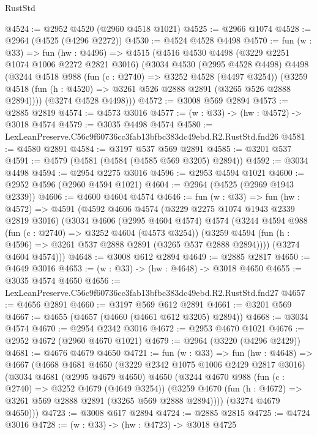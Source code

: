 \begin{lexlean}{RustStd}
\begin{coremodule}
@4524 := @2952 @4520 (@2960 @4518 @1021)
@4525 := @2966 @1074
@4528 := @2964 (@4525 (@4296 @2272))
@4530 := @4524 @4528 @4498
@4570 := fun (w : @33) =>
  fun (hw : @4496) =>
  @4515
    (@4516
      @4530
      @4498
      (@3229 @2251 @1074 @1006 @2272 @2821 @3016)
      (@3034
        @4530
        (@2995 @4528 @4498)
        @4498
        (@3244
          @4518
          @988
          (fun (c : @2740) => @3252 @4528 (@4497 @3254))
          (@3259 @4518 (fun (h : @4520) => @3261 @526 @2888 @2891 (@3265 @526 @2888 @2894))))
        (@3274 @4528 @4498)))
@4572 := @3008 @569 @2894
@4573 := @2885 @2819
@4574 := @4573 @3016
@4577 := (w : @33) -> (hw : @4572) -> @3018 @4574
@4579 := @3035 @4498 @4574
@4580 := LexLeanPreserve.C56c9f60736cc3fab13bfbc383dc49ebd.R2.RustStd.fnd26
@4581 := @4580 @2891
@4584 := @3197 @537 @569 @2891
@4585 := @3201 @537
@4591 := @4579 (@4581 (@4584 (@4585 @569 @3205) @2894))
@4592 := @3034 @4498
@4594 := @2954 @2275 @3016
@4596 := @2953 @4594 @1021
@4600 := @2952 @4596 (@2960 @4594 @1021)
@4604 := @2964 (@4525 (@2969 @1943 @2339))
@4606 := @4600 @4604 @4574
@4646 := fun (w : @33) =>
  fun (hw : @4572) =>
  @4591
    (@4592
      @4606
      @4574
      (@3229 @2275 @1074 @1943 @2339 @2819 @3016)
      (@3034
        @4606
        (@2995 @4604 @4574)
        @4574
        (@3244
          @4594
          @988
          (fun (c : @2740) => @3252 @4604 (@4573 @3254))
          (@3259 @4594 (fun (h : @4596) => @3261 @537 @2888 @2891 (@3265 @537 @2888 @2894))))
        (@3274 @4604 @4574)))
@4648 := @3008 @612 @2894
@4649 := @2885 @2817
@4650 := @4649 @3016
@4653 := (w : @33) -> (hw : @4648) -> @3018 @4650
@4655 := @3035 @4574 @4650
@4656 := LexLeanPreserve.C56c9f60736cc3fab13bfbc383dc49ebd.R2.RustStd.fnd27
@4657 := @4656 @2891
@4660 := @3197 @569 @612 @2891
@4661 := @3201 @569
@4667 := @4655 (@4657 (@4660 (@4661 @612 @3205) @2894))
@4668 := @3034 @4574
@4670 := @2954 @2342 @3016
@4672 := @2953 @4670 @1021
@4676 := @2952 @4672 (@2960 @4670 @1021)
@4679 := @2964 (@3220 (@4296 @2429))
@4681 := @4676 @4679 @4650
@4721 := fun (w : @33) =>
  fun (hw : @4648) =>
  @4667
    (@4668
      @4681
      @4650
      (@3229 @2342 @1075 @1006 @2429 @2817 @3016)
      (@3034
        @4681
        (@2995 @4679 @4650)
        @4650
        (@3244
          @4670
          @988
          (fun (c : @2740) => @3252 @4679 (@4649 @3254))
          (@3259 @4670 (fun (h : @4672) => @3261 @569 @2888 @2891 (@3265 @569 @2888 @2894))))
        (@3274 @4679 @4650)))
@4723 := @3008 @617 @2894
@4724 := @2885 @2815
@4725 := @4724 @3016
@4728 := (w : @33) -> (hw : @4723) -> @3018 @4725

\end{coremodule}
\end{lexlean}
